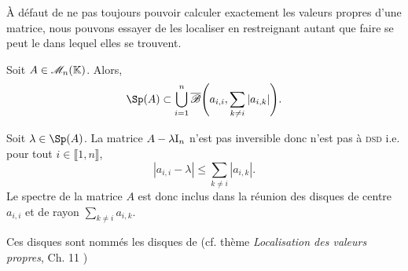 À défaut de ne pas toujours pouvoir calculer exactement les valeurs propres d'une matrice, nous pouvons essayer de les localiser en restreignant autant que faire se peut le  dans lequel elles se trouvent.

\begin{theo} 
    Soit $A \in \mathscr{M}_n(\mathbb{K})$. Alors, $$\Sp(A) \subset \bigcup\limits_{i=1}^{n} \overline{\mathscr{B}} \Bigg( a_{i,i}, \sum\limits_{k \not = i} |a_{i,k}| \Bigg).$$
\end{theo}

\begin{demo}
    Soit $\lambda \in \Sp(A)$. La matrice $A - \lambda \mathrm{I}_n$ n'est pas inversible \note 
    donc n'est pas à \textsc{dsd} i.e. pour tout $i \in \llbracket 1, n \rrbracket$,
    $$|a_{i,i} - \lambda| \leqslant \sum_{k \not= i} |a_{i,k}|.$$
    Le spectre de la matrice $A$ est donc inclus dans la réunion des disques de centre $a_{i,i}$ et de rayon $\sum\limits_{k \not=i} a_{i,k}$.
\end{demo} 

\begin{defi}
    Ces disques sont nommés les disques de  \note (cf. thème \textit{Localisation des valeurs propres}, Ch. 11 \cite{acamanes})
\end{defi}




